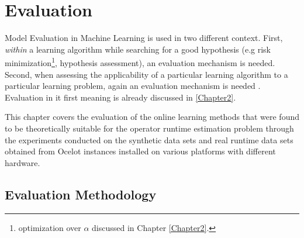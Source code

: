 
\chapter{Evaluation} %

\label{Chapter6} %


Model Evaluation in Machine Learning is used in two different context. First, \textit{within} a learning algorithm while searching for a good hypothesis (e.g risk minimization\footnote{optimization over $\alpha$ discussed in Chapter \ref{Chapter2}.}, hypothesis assessment), an evaluation mechanism is needed. Second, when assessing the applicability of a particular learning algorithm to a particular learning problem, again an evaluation mechanism is needed \cite{gama_evaluating_2013}. Evaluation in it first meaning is already discussed in \ref{Chapter2}.

This chapter covers the evaluation of the online learning methods that were found to be theoretically suitable for the operator runtime estimation problem through the experiments conducted on the synthetic data sets and real runtime data sets obtained from Ocelot instances installed on various platforms with different hardware. 

\section{Evaluation Methodology}

